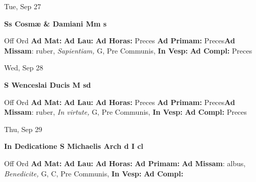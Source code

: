 \documentclass[10pt]{book}
\begin{document}
\begin{center}
\begin{minipage}{3.5in}
\vspace{2em}
\begin{center}Tue, Sep 27
\end{center}
\textbf{ \large Ss Cosmæ \& Damiani Mm
\textnormal{\normalsize s}}

\begin{justify}Off Ord
\textbf{Ad Mat: }
\textbf{Ad Lau: }
\textbf{Ad Horas: }Preces
\textbf{Ad Primam: }Preces\textbf{Ad Missam}: ruber, \textit{Sapientiam,} G, Pre Communis, 
\textbf{In Vesp: }
\textbf{Ad Compl: }Preces
\end{justify}
\end{minipage}
\end{center}

\begin{center}
\begin{minipage}{3.5in}
\vspace{2em}
\begin{center}Wed, Sep 28
\end{center}
\textbf{ \large S Wenceslai Ducis M
\textnormal{\normalsize sd}}

\begin{justify}Off Ord
\textbf{Ad Mat: }
\textbf{Ad Lau: }
\textbf{Ad Horas: }Preces
\textbf{Ad Primam: }Preces\textbf{Ad Missam}: ruber, \textit{In virtute,} G, Pre Communis, 
\textbf{In Vesp: }
\textbf{Ad Compl: }Preces
\end{justify}
\end{minipage}
\end{center}

\begin{center}
\begin{minipage}{3.5in}
\vspace{2em}
\begin{center}Thu, Sep 29
\end{center}
\textbf{ \large In Dedicatione S Michaelis Arch
\textnormal{\normalsize d I cl}}

\begin{justify}Off Ord
\textbf{Ad Mat: }
\textbf{Ad Lau: }
\textbf{Ad Horas: }
\textbf{Ad Primam: }\textbf{Ad Missam}: albus, \textit{Benedicite,} G, C, Pre Communis, 
\textbf{In Vesp: }
\textbf{Ad Compl: }
\end{justify}
\end{minipage}
\end{center}
\end{document}
